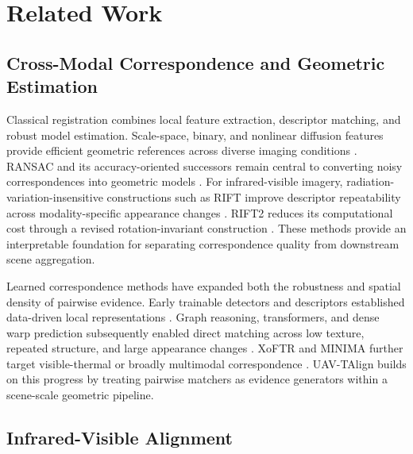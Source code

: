 
\section{Related Work}

\subsection{Cross-Modal Correspondence and Geometric Estimation}

Classical registration combines local feature extraction, descriptor matching, and robust model
estimation. Scale-space, binary, and nonlinear diffusion features provide efficient geometric
references across diverse imaging conditions
\cite{lowe2004sift,bay2008surf,rublee2011orb,leutenegger2011brisk,alcantarilla2012kaze,alcantarilla2013akaze}.
RANSAC and its accuracy-oriented successors remain central to converting noisy correspondences
into geometric models
\cite{fischler1981ransac,hartley2004multiple,barath2019magsac,barath2020magsacpp}.
For infrared-visible imagery, radiation-variation-insensitive constructions such as RIFT improve
descriptor repeatability across modality-specific appearance changes \cite{li2020rift}.
RIFT2 reduces its computational cost through a revised rotation-invariant construction
\cite{li2023rift2}. These
methods provide an interpretable foundation for separating correspondence quality from downstream
scene aggregation.

Learned correspondence methods have expanded both the robustness and spatial density of pairwise
evidence. Early trainable detectors and descriptors established data-driven local representations
\cite{detone2018superpoint,ono2018lfnet,dusmanu2019d2net,revaud2019r2d2,tyszkiewicz2020disk,germain2020s2dnet,mishchuk2017hardnet,tian2017l2net,tian2019sosnet}.
Graph reasoning, transformers, and dense warp prediction subsequently enabled direct matching
across low texture, repeated structure, and large appearance changes
\cite{sarlin2020superglue,rocco2018ncnet,zhou2021patch2pix,jiang2021cotr,sun2021loftr,chen2022aspanformer,lindenberger2023lightglue,edstedt2023dkm,edstedt2024roma,wang2024efficientloftr,jiang2024omniglue}.
XoFTR and MINIMA further target visible-thermal or broadly multimodal correspondence
\cite{tuzcuoglu2024xoftr,ren2025minima}. UAV-TAlign builds on this progress by treating pairwise
matchers as evidence generators within a scene-scale geometric pipeline.

\subsection{Infrared-Visible Alignment}

